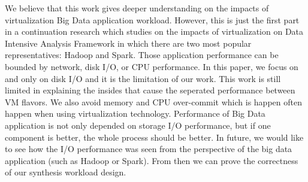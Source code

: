 \documentclass{acmsig}
\begin{document}
We believe that this work gives deeper understanding on the impacts of virtualization Big Data application workload. However, this is just the first part in a continuation research which studies on the impacts of virtualization on Data Intensive Analysis Framework in which there are two most popular representatives: Hadoop and Spark. Those application performance can be bounded by network, disk I/O, or CPU performance. In this paper, we focus on and only on disk I/O and it is the limitation of our work. This work is still limited in explaining the insides that cause the seperated performance between VM flavors. We also avoid memory and CPU over-commit which is happen often happen when using virtualization technology. Performance of Big Data application is not only depended on storage I/O performance, but if one component is better, the whole process should be better. In future, we would like to see how the I/O performance was seen from the perspective of the big data application (such as Hadoop or Spark). From then we can prove the correctness of our synthesis workload design.




\balance


\end{document}
